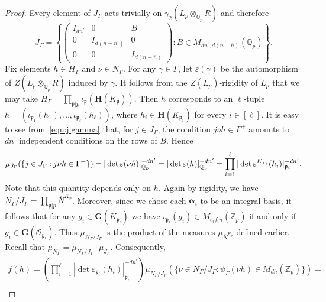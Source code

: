 \documentclass[11pt,a4paper]{amsart}
\theoremstyle{plain}
\theoremstyle{remark}
\newcommand{\Z}{\mathbb{Z}}
\newcommand{\Q}{\mathbb{Q}}
\newcommand{\tensor}{\otimes}
\newcommand{\p}{\mathfrak{p}}
\newcommand{\npr}{\ell}
\newcommand{\dimL}{n}
\newcommand{\overdim}{\overline{n}}
\def \p {\ensuremath{\mathfrak{p}}}
\begin{document}
\begin{proof}
Every element of $J_\Gamma$ acts trivially on $\gamma_2 (L_p \tensor_{\Q_p} R)$ and therefore 
\begin{equation} \label{equ:j.gamma}
J_\Gamma = \left\{
\left( \begin{array}{ccc} I_{d \dimL^\prime} & 0 & B \\
0 & I_{d(\overdim - \dimL^\prime)} & 0 \\
0 & 0 & I_{d(\dimL - \overdim)} \end{array} \right) : 
B \in M_{d \dimL^\prime, d(\dimL - \overdim)}(\Q_p) \right\}.
\end{equation}
Fix elements $h \in H_\Gamma$ and $\nu \in N_\Gamma$.  For any $\gamma \in  \Gamma$, let $\varepsilon(\gamma)$ be the automorphism of $Z(L_p \tensor_{\Q_p} R)$ induced by $\gamma$.  It follows from the $Z(L_p)$-rigidity of $L_p$ that we may take
$H_\Gamma = \prod_{\p | p} \iota_\p ( \mathbf{H}(K_\p))$.  Then $h$ corresponds to an $\npr$-tuple $h = (\iota_{\p_1} (h_1), \dots, \iota_{\p_\npr} (h_\npr))$, where $h_i \in \mathbf{H}(K_{\p_i})$ for every $i \in [\npr]$.
It is easy to see from~\eqref{equ:j.gamma} that, for $j \in J_\Gamma$, the condition $j \nu h \in \Gamma^+$ amounts to $d \dimL^\prime$ independent conditions on the rows of $B$.  Hence
\begin{equation} \label{equ:j.measure}
\setlength{\thickmuskip}{.9\thickmuskip}
\setlength{\medmuskip}{.9\medmuskip}
\mu_{J_\Gamma}( \{ j \in J_\Gamma : j \nu h \in \Gamma^+ \}) = | \det \varepsilon(\nu h) |_{\Q_p}^{-d \dimL^\prime} = | \det \varepsilon(h) |_{\Q_p}^{-d \dimL^\prime} = \prod_{i = 1}^\npr | \det \varepsilon^{K_{\p_i}}(h_i) |_{\p_i}^{- d \dimL^\prime}.
\end{equation}
Note that this quantity depends only on $h$.
Again by rigidity, we have $N_\Gamma / J_\Gamma = \prod_{\p | p} \overline{N}^{K_{\p}}$.  Moreover, since we chose each $\boldsymbol{\alpha}_i$ to be an integral basis, it follows that for any $g_i \in \mathbf{G}(K_{\p_i})$ we have $\iota_{\p_i} (g_i) \in M_{e_i f_i \dimL}(\Z_p)$ if and only if $g_i \in \mathbf{G}(\mathcal{O}_{\p_i})$.  Thus $\mu_{N_\Gamma / J_\Gamma}$ is the product of the measures $\mu_{\overline{N}^{K_\p}}$ defined earlier.  Recall that $\mu_{N_\Gamma} = \mu_{N_\Gamma / J_\Gamma} \cdot \mu_{J_{\Gamma}}$.  Consequently, 
\begin{multline*}
 f(h) = \left( \prod_{i = 1}^\npr | \det \varepsilon_{\p_i}(h_i) |_{\p_i}^{-d \dimL^\prime} \right) \mu_{N_\Gamma / J_\Gamma}( \{ \overline{\nu} \in N_\Gamma / J_\Gamma : \psi_\Gamma(\overline{\nu}h) \in M_{d \overdim}(\Z_p) \}) = \\

\end{multline*}
\end{proof}
\end{document}
